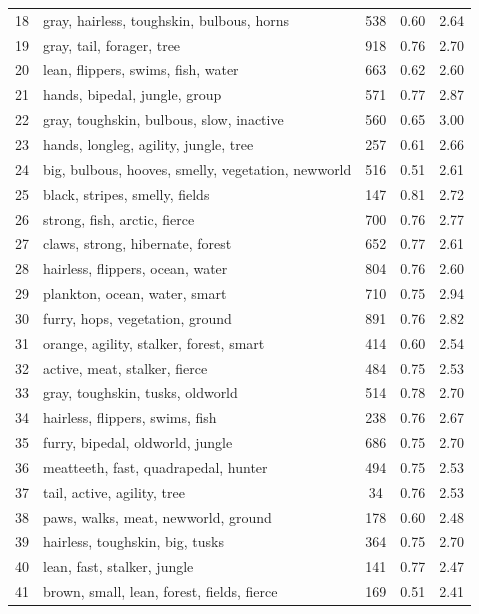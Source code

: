 \begin{table}[H]
\begin{tabular}{clccc}
        18 & gray, hairless, toughskin, bulbous, horns & 538 & 0.60 & 2.64 \\
        19 & gray, tail, forager, tree & 918 & 0.76 & 2.70 \\
        20 & lean, flippers, swims, fish, water & 663 & 0.62 & 2.60 \\
        21 & hands, bipedal, jungle, group & 571 & 0.77 & 2.87 \\
        22 & gray, toughskin, bulbous, slow, inactive & 560 & 0.65 & 3.00 \\
        23 & hands, longleg, agility, jungle, tree & 257 & 0.61 & 2.66 \\
        24 & big, bulbous, hooves, smelly, vegetation, newworld & 516 & 0.51 & 2.61 \\
        25 & black, stripes, smelly, fields & 147 & 0.81 & 2.72 \\
        26 & strong, fish, arctic, fierce & 700 & 0.76 & 2.77 \\
        27 & claws, strong, hibernate, forest & 652 & 0.77 & 2.61 \\
        28 & hairless, flippers, ocean, water & 804 & 0.76 & 2.60 \\
        29 & plankton, ocean, water, smart & 710 & 0.75 & 2.94 \\
        30 & furry, hops, vegetation, ground & 891 & 0.76 & 2.82 \\
        31 & orange, agility, stalker, forest, smart & 414 & 0.60 & 2.54 \\
        32 & active, meat, stalker, fierce & 484 & 0.75 & 2.53 \\
        33 & gray, toughskin, tusks, oldworld & 514 & 0.78 & 2.70 \\
        34 & hairless, flippers, swims, fish & 238 & 0.76 & 2.67 \\
        35 & furry, bipedal, oldworld, jungle & 686 & 0.75 & 2.70 \\
        36 & meatteeth, fast, quadrapedal, hunter & 494 & 0.75 & 2.53 \\
        37 & tail, active, agility, tree & 34 & 0.76 & 2.53 \\
        38 & paws, walks, meat, newworld, ground & 178 & 0.60 & 2.48 \\
        39 & hairless, toughskin, big, tusks & 364 & 0.75 & 2.70 \\
        40 & lean, fast, stalker, jungle & 141 & 0.77 & 2.47 \\
        41 & brown, small, lean, forest, fields, fierce & 169 & 0.51 & 2.41 \\

\end{tabular}
\end{table}
